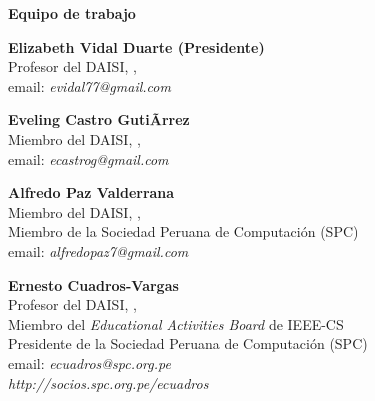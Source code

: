 \begin{center}
{\bf \Huge Equipo de trabajo}
\end{center}
\vspace{1cm}

\begin{center}
\textbf{Elizabeth Vidal Duarte (Presidente)}\\
Profesor del DAISI, \University, \city\\
email: \textit{evidal77@gmail.com}
\end{center}

\begin{center}
\textbf{Eveling Castro GutiÃrrez}\\
Miembro del DAISI, \University, \city\\
email: \textit{ecastrog@gmail.com}
\end{center}

\begin{center}
\textbf{Alfredo Paz Valderrana}\\
Miembro del DAISI, \University, \city\\
Miembro de la Sociedad Peruana de Computación (SPC)\\
email: \textit{alfredopaz7@gmail.com}
\end{center}

\begin{center}
\textbf{Ernesto Cuadros-Vargas}\\
Profesor del DAISI, \University, \city\\
Miembro del \textit{Educational Activities Board} de IEEE-CS\\
Presidente de la Sociedad Peruana de Computación (SPC)\\
email: \textit{ecuadros@spc.org.pe}\\
\textit{http://socios.spc.org.pe/ecuadros}
\end{center}




